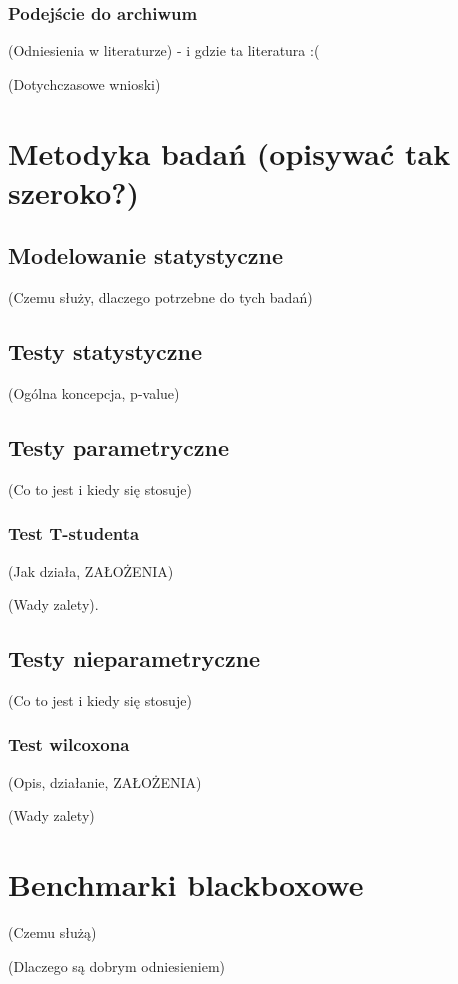 \documentclass[11pt]{report}
\begin{document}
\subsubsection{Podejście do archiwum}
\par{(Odniesienia w literaturze) - i gdzie ta literatura :(}
\par{(Dotychczasowe wnioski)}

\section{Metodyka badań (opisywać tak szeroko?)}
\subsection{Modelowanie statystyczne}
\par{
(Czemu służy, dlaczego potrzebne do tych badań)
}
\subsection{Testy statystyczne}
\par{
(Ogólna koncepcja, p-value)
}
\subsection{Testy parametryczne}
\par{
(Co to jest i kiedy się stosuje)
}
\subsubsection{Test T-studenta}
\par{
(Jak działa, ZAŁOŻENIA)
}
\par{
(Wady zalety).
}

\subsection{Testy nieparametryczne}
\par{
(Co to jest i kiedy się stosuje)
}
\subsubsection{Test wilcoxona}
\par{
(Opis, działanie, ZAŁOŻENIA)
}
\par{
(Wady zalety)
}
\section{Benchmarki blackboxowe}
\par{
(Czemu służą)
}
\par{
(Dlaczego są dobrym odniesieniem)
}
\end{document}
